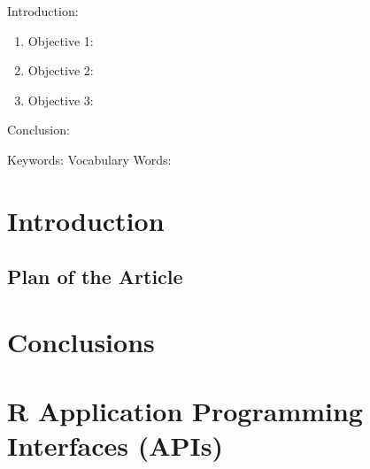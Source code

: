 

\twocolumn
\scriptsize
\begin{frontmatter}
		\title{}
		\author{}
		\address{The Mathematical Learning Space}
\end{frontmatter}	

Introduction:
\begin{enumerate}
\item Objective 1:
\item Objective 2:
\item Objective 3:
\end{enumerate}
Conclusion:

Keywords:
Vocabulary Words:

\section{Introduction}

\subsection{Plan of the Article}


\section{Conclusions}


\section{R Application Programming Interfaces (APIs)}




